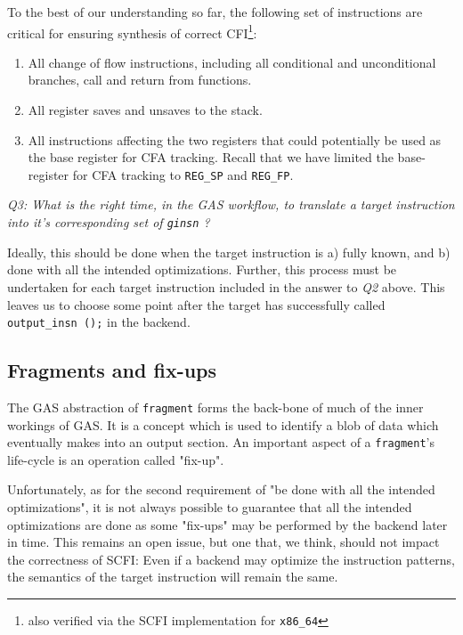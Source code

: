 \documentclass{article} \usepackage[a4paper, total={6in, 8in}]{geometry}
\begin{document}
To the best of our understanding so far, the following set of instructions are
critical for ensuring synthesis of correct CFI\footnote{also verified via
the SCFI implementation for \texttt{x86\_64}}:

\begin{enumerate}
\item All change of flow instructions, including all conditional and
unconditional branches, call and return from functions.
\item All register saves and unsaves to the stack.
\item All instructions affecting the two registers that could potentially be
used as the base register for CFA tracking.  Recall that we have limited the
base-register for CFA tracking to \texttt{REG\_SP} and \texttt{REG\_FP}.
\end{enumerate}

\begin{center}
\emph{Q3: What is the right time, in the GAS workflow, to translate a target
instruction into it's corresponding set of \texttt{ginsn} ?}
\end{center}

Ideally, this should be done when the target instruction is a) fully known, and
b) done with all the intended optimizations. Further, this process must be
undertaken for each target instruction included in the answer to \emph{Q2}
above.  This leaves us to choose some point after the target has successfully
called \texttt{output\_insn ();} in the backend.

\subsection{Fragments and fix-ups}
The GAS abstraction of \texttt{fragment} forms the back-bone of much of the
inner workings of GAS.  It is a concept which is used to identify a blob of
data which eventually makes into an output section.  An important aspect of a
\texttt{fragment}'s life-cycle is an operation called "fix-up".

Unfortunately, as for the second requirement of "be done with all the intended
optimizations", it is not always possible to guarantee that all the intended
optimizations are done as some "fix-ups" may be performed by the backend later
in time.  This remains an open issue, but one that, we think, should not impact
the correctness of SCFI: Even if a backend may optimize the instruction
patterns, the semantics of the target instruction will remain the same.
\end{document}
